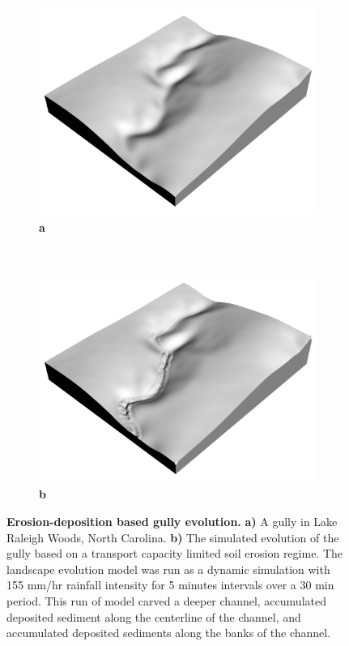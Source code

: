 \documentclass[final,3p,times,twocolumn]{elsarticle}
\begin{document}
\begin{figure}
\centering
%   
\begin{subfigure}[b]{0.4\textwidth}
\includegraphics[width=\textwidth]{images/elevation_render.png}
\label{fig_3_1}
\textbf{a} \\
\end{subfigure}
%
~ %
%
\begin{subfigure}[b]{0.4\textwidth}
\includegraphics[width=\textwidth]{images/evolved_elevation_render.png}
\label{fig_3_2}
\textbf{b} \\
\end{subfigure}
%
\caption{{\bf Erosion-deposition based gully evolution.}
\textbf{a)}
A gully in Lake Raleigh Woods, North Carolina.
\textbf{b)}
The simulated evolution of the gully based on a transport capacity limited  soil erosion regime.
The landscape evolution model was run as a dynamic simulation with 155 mm/hr rainfall intensity for 5 minutes intervals over a 30 min period.
This run of model carved a deeper channel, accumulated deposited sediment along the centerline of the channel, and accumulated deposited sediments along the banks of the channel.
}
\label{fig_3}
\end{figure}
\end{document}
